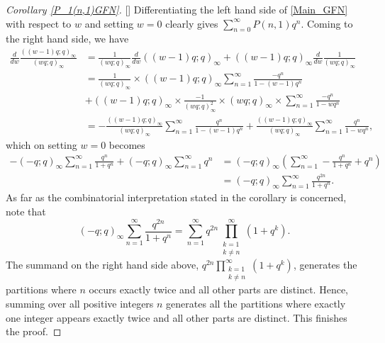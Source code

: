 \documentclass[12pt,reqno]{amsart}
\renewcommand{\(}{\left\(}
\renewcommand{\)}{\right\)}
\renewcommand{\[}{\left\[}
\renewcommand{\]}{\right\]}
\numberwithin{equation}{section}
\theoremstyle{plain}
\begin{document}
\begin{proof}[Corollary \textup{\ref{P_1(n,1)GFN}}][]
Differentiating the left hand side of \eqref{Main_GFN} with respect to $w$ and setting $w=0$ clearly gives $\sum_{n=0}^{\infty} P(n, 1) q^n$. Coming to the right hand side, we have
\begin{align*}
\frac{d}{dw} \frac{((w-1)q; q)_{\infty}}{(wq; q)_{\infty}} &= \frac{1}{(wq; q)_{\infty}}\frac{d}{dw}((w-1)q; q)_{\infty} + ((w-1)q; q)_{\infty}\frac{d}{dw} \frac{1}{(wq; q)_{\infty}} \\
&= \frac{1}{(wq; q)_{\infty}} \times ((w-1)q; q)_{\infty} \sum_{n=1}^{\infty}\frac{-q^n}{1 - (w-1) q^n} \\
&+ ((w-1)q; q)_{\infty} \times \frac{-1}{(wq; q)_{\infty}^2} \times (wq; q)_{\infty} \times \sum_{n=1}^{\infty} \frac{-q^n}{1 - wq^n} \\
&= -\frac{((w-1)q; q)_{\infty}}{(wq; q)_{\infty}}\sum_{n=1}^{\infty}\frac{q^n}{1 - (w-1) q^n} + \frac{((w-1)q; q)_{\infty}}{(wq; q)_{\infty}} \sum_{n=1}^{\infty} \frac{q^n}{1 - wq^n},
\end{align*}
which on setting $w=0$ becomes
\begin{align*}
-(-q; q)_{\infty}\sum_{n=1}^{\infty} \frac{q^n}{1 + q^n} + (-q; q)_{\infty}\sum_{n=1}^{\infty}q^n &=(-q; q)_{\infty}\left(\sum_{n=1}^{\infty} -\frac{q^n}{1 + q^n} + q^n \right) \\
&  = (-q; q)_{\infty}\sum_{n=1}^{\infty}\frac{q^{2n}}{1 + q^n}.
\end{align*}
As far as the combinatorial interpretation stated in the corollary is concerned, note that
\begin{equation*}
(-q; q)_{\infty}\sum_{n=1}^{\infty}\frac{q^{2n}}{1 + q^n} = \sum_{n=1}^{\infty} q^{2n} \prod_{\substack{k=1 \\ k \neq n}}^{\infty} (1+q^k).
\end{equation*}
The summand on the right hand side above, $q^{2n} \prod_{\substack{k=1 \\ k \neq n}}^{\infty} (1+q^k)$, generates the partitions where $n$ occurs exactly twice and all other parts are distinct. Hence, summing over all positive integers $n$ generates all the partitions where exactly one integer appears exactly twice and all other parts are distinct. This finishes the proof.
\end{proof}
\end{document}
